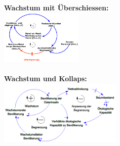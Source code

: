 \begin{multicols}{2}
	\textbf{Wachstum mit Überschiessen:} \\
	\includegraphics[width=0.3\textwidth]{pictures/struktur_5} \\ \\
	\textbf{Wachstum und Kollaps:} \\
	\includegraphics[width=0.45\textwidth]{pictures/struktur_6} 
\end{multicols}	

